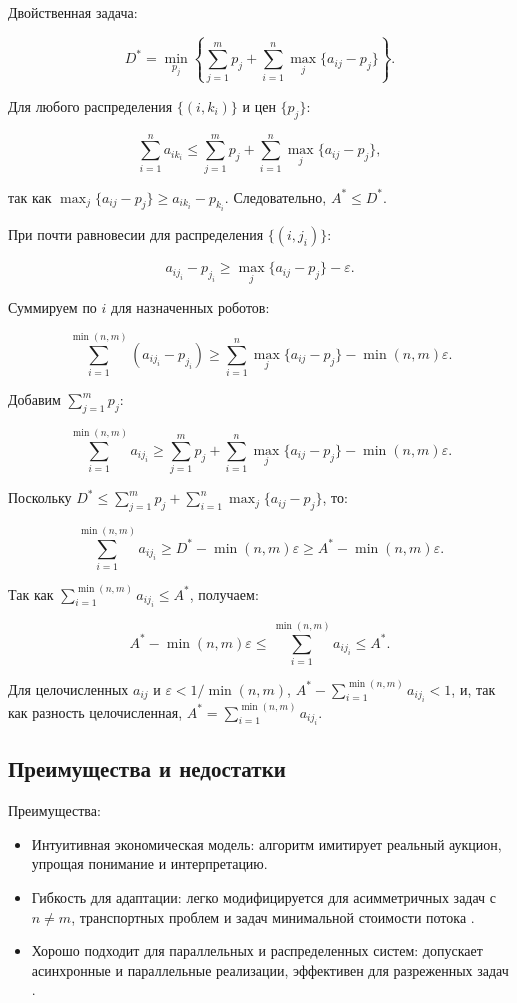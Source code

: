 Двойственная задача:

\[
D^* = \min_{p_j} \left\{ \sum_{j=1}^m p_j + \sum_{i=1}^n \max_j \{a_{ij} - p_j\} \right\}.
\]

Для любого распределения \( \{ (i, k_i) \} \) и цен \( \{ p_j \} \):

\[
\sum_{i=1}^n a_{i k_i} \leq \sum_{j=1}^m p_j + \sum_{i=1}^n \max_j \{a_{ij} - p_j\},
\]

так как \( \max_j \{a_{ij} - p_j\} \geq a_{i k_i} - p_{k_i} \). Следовательно, \( A^* \leq D^* \).

При почти равновесии для распределения \( \{ (i, j_i) \} \):

\[
a_{i j_i} - p_{j_i} \geq \max_j \{a_{ij} - p_j\} - \varepsilon.
\]

Суммируем по \( i \) для назначенных роботов:

\[
\sum_{i=1}^{\min(n, m)} (a_{i j_i} - p_{j_i}) \geq \sum_{i=1}^n \max_j \{a_{ij} - p_j\} - \min(n, m) \varepsilon.
\]

Добавим \( \sum_{j=1}^m p_j \):

\[
\sum_{i=1}^{\min(n, m)} a_{i j_i} \geq \sum_{j=1}^m p_j + \sum_{i=1}^n \max_j \{a_{ij} - p_j\} - \min(n, m) \varepsilon.
\]

Поскольку \( D^* \leq \sum_{j=1}^m p_j + \sum_{i=1}^n \max_j \{a_{ij} - p_j\} \), то:

\[
\sum_{i=1}^{\min(n, m)} a_{i j_i} \geq D^* - \min(n, m) \varepsilon \geq A^* - \min(n, m) \varepsilon.
\]

Так как \( \sum_{i=1}^{\min(n, m)} a_{i j_i} \leq A^* \), получаем:

\[
A^* - \min(n, m) \varepsilon \leq \sum_{i=1}^{\min(n, m)} a_{i j_i} \leq A^*.
\]

Для целочисленных \( a_{ij} \) и \( \varepsilon < 1/\min(n, m) \), \( A^* - \sum_{i=1}^{\min(n, m)} a_{i j_i} < 1 \), и, так как разность целочисленная, \( A^* = \sum_{i=1}^{\min(n, m)} a_{i j_i} \).

\subsection{Преимущества и недостатки}
Преимущества:
\begin{itemize}
    \item Интуитивная экономическая модель: алгоритм имитирует реальный аукцион, упрощая понимание и интерпретацию.
    \item Гибкость для адаптации: легко модифицируется для асимметричных задач с \( n \neq m \), транспортных проблем и задач минимальной стоимости потока \cite{bertsekas1990}.
    \item Хорошо подходит для параллельных и распределенных систем: допускает асинхронные и параллельные реализации, эффективен для разреженных задач \cite{gerkey2003}.
\end{itemize}

